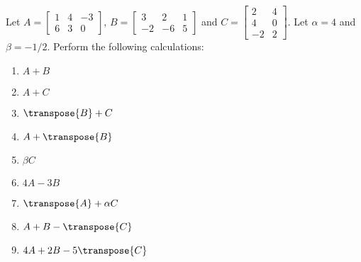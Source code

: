 Let 
$A = \begin{bmatrix} 1 & 4 & -3 \\ 6 & 3 & 0\end{bmatrix}$, 
$B = \begin{bmatrix} 3 & 2 & 1 \\ -2 & -6 & 5\end{bmatrix}$ and 
$C = \begin{bmatrix} 2 & 4 \\ 4 & 0 \\ -2 & 2\end{bmatrix}$.  
Let $\alpha = 4$ and $\beta = -1/2$.  
Perform the following calculations:
%
\begin{enumerate}
\item $A + B$
\item $A + C$
\item $\transpose{B} + C$
\item $A + \transpose{B}$
\item $\beta C$
\item $4A - 3B$
\item $\transpose{A} + \alpha C$
\item $A + B - \transpose{C}$
\item $4A + 2B - 5\transpose{C}$
\end{enumerate}
%